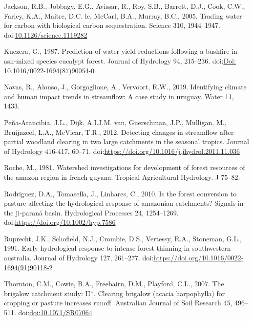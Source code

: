 \documentclass[]{elsarticle} %
\begin{document}
\leavevmode\hypertarget{ref-jackson2005}{}%
Jackson, R.B., Jobbagy, E.G., Avissar, R., Roy, S.B., Barrett, D.J., Cook, C.W., Farley, K.A., Maitre, D.C. le, McCarl, B.A., Murray, B.C., 2005. Trading water for carbon with biological carbon sequestration. Science 310, 1944--1947. doi:\href{https://doi.org/10.1126/science.1119282}{10.1126/science.1119282}

\leavevmode\hypertarget{ref-kuczera1987}{}%
Kuczera, G., 1987. Prediction of water yield reductions following a bushfire in ash-mixed species eucalypt forest. Journal of Hydrology 94, 215--236. doi:\href{https://doi.org/Doi:\%2010.1016/0022-1694(87)90054-0}{Doi: 10.1016/0022-1694(87)90054-0}

\leavevmode\hypertarget{ref-navas2019}{}%
Navas, R., Alonso, J., Gorgoglione, A., Vervoort, R.W., 2019. Identifying climate and human impact trends in streamflow: A case study in uruguay. Water 11, 1433.

\leavevmode\hypertarget{ref-pena-arancibia2012}{}%
Peña-Arancibia, J.L., Dijk, A.I.J.M. van, Guerschman, J.P., Mulligan, M., Bruijnzeel, L.A., McVicar, T.R., 2012. Detecting changes in streamflow after partial woodland clearing in two large catchments in the seasonal tropics. Journal of Hydrology 416-417, 60--71. doi:\href{https://doi.org/https://doi.org/10.1016/j.jhydrol.2011.11.036}{https://doi.org/10.1016/j.jhydrol.2011.11.036}

\leavevmode\hypertarget{ref-roche1981}{}%
Roche, M., 1981. Watershed investigations for development of forest resources of the amazon region in french guyana. Tropical Agricultural Hydrology. J 75--82.

\leavevmode\hypertarget{ref-rodriguez2010}{}%
Rodriguez, D.A., Tomasella, J., Linhares, C., 2010. Is the forest conversion to pasture affecting the hydrological response of amazonian catchments? Signals in the ji-paraná basin. Hydrological Processes 24, 1254--1269. doi:\href{https://doi.org/https://doi.org/10.1002/hyp.7586}{https://doi.org/10.1002/hyp.7586}

\leavevmode\hypertarget{ref-ruprechtetal1991}{}%
Ruprecht, J.K., Schofield, N.J., Crombie, D.S., Vertessy, R.A., Stoneman, G.L., 1991. Early hydrological response to intense forest thinning in southwestern australia. Journal of Hydrology 127, 261--277. doi:\href{https://doi.org/https://doi.org/10.1016/0022-1694(91)90118-2}{https://doi.org/10.1016/0022-1694(91)90118-2}

\leavevmode\hypertarget{ref-thornton2007}{}%
Thornton, C.M., Cowie, B.A., Freebairn, D.M., Playford, C.L., 2007. The brigalow catchment study: II*. Clearing brigalow (acacia harpophylla) for cropping or pasture increases runoff. Australian Journal of Soil Research 45, 496--511. doi:\href{https://doi.org/doi:10.1071/SR07064}{doi:10.1071/SR07064}
\end{document}

